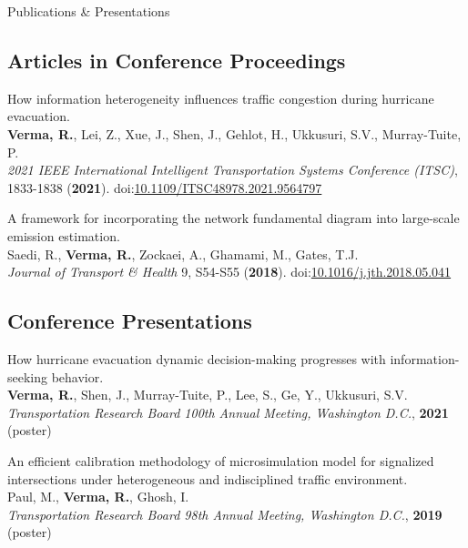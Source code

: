 \documentclass{res} %
\begin{document}
\begin{rSection}{Publications \& Presentations}
        \subsection*{Articles in Conference Proceedings}
        \begin{etaremune}
            \item How information heterogeneity influences traffic congestion during hurricane evacuation.
            \\ \textbf{Verma, R.}, Lei, Z., Xue, J., Shen, J., Gehlot, H., Ukkusuri, S.V., Murray-Tuite, P.
            \\ \textit{2021 IEEE International Intelligent Transportation Systems Conference (ITSC)}, 1833-1838 (\textbf{2021}). doi:\href{https://ieeexplore.ieee.org/document/9564797}{10.1109/ITSC48978.2021.9564797}

            \item A framework for incorporating the network fundamental diagram into large-scale emission estimation.
            \\ Saedi, R., \textbf{Verma, R.}, Zockaei, A., Ghamami, M., Gates, T.J.
            \\ \textit{Journal of Transport \& Health} 9, S54-S55 (\textbf{2018}). doi:\href{https://www.sciencedirect.com/science/article/abs/pii/S2214140518302263}{10.1016/j.jth.2018.05.041}
        \end{etaremune}

        \subsection*{Conference Presentations}
        \begin{etaremune}
            \item How hurricane evacuation dynamic decision-making progresses with information-seeking behavior.
            \\ \textbf{Verma, R.}, Shen, J., Murray-Tuite, P., Lee, S., Ge, Y., Ukkusuri, S.V.
            \\ \textit{Transportation Research Board 100th Annual Meeting, Washington D.C.}, \textbf{2021} (poster)

            \item An efficient calibration methodology of microsimulation model for signalized intersections under heterogeneous and indisciplined traffic environment.
            \\ Paul, M., \textbf{Verma, R.}, Ghosh, I.
            \\ \textit{Transportation Research Board 98th Annual Meeting, Washington D.C.}, \textbf{2019} (poster)


\end{etaremune}
\end{rSection}
\end{document}
